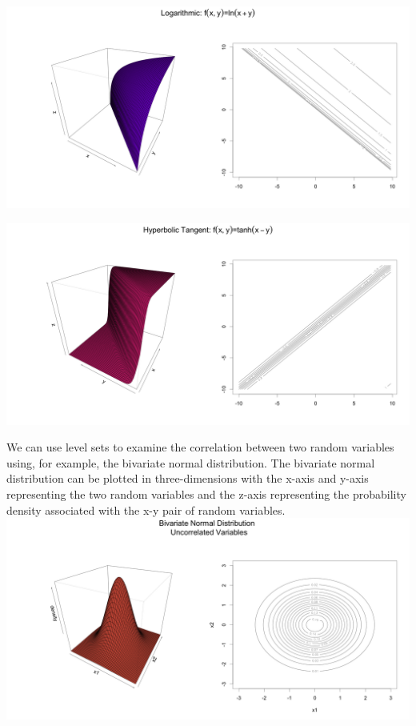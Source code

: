 \documentclass[12pt]{article}
\begin{document}
\indent\includegraphics[scale=0.2]{logarithmic_3d.png}

\indent\includegraphics[scale=0.2]{hyperbolictangent_3d.png}

 We can use level sets to examine the correlation between two random variables using, for example, the bivariate normal distribution. The bivariate normal distribution can be plotted in three-dimensions with the x-axis and y-axis representing the two random variables and the z-axis representing the probability density associated with the x-y pair of random variables. \\

\indent\includegraphics[scale=0.2]{bivariate_3d.png}
\end{document}
